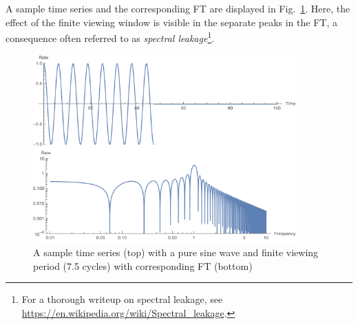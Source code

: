 A sample time series and the corresponding FT are displayed in Fig.~\ref{fig:ex_fft}. Here, the effect of the finite viewing window is visible in the separate peaks in the FT, a consequence often referred to as \textit{spectral leakage}\footnote{For a thorough writeup on spectral leakage, see \url{https://en.wikipedia.org/wiki/Spectral_leakage}.}.
\begin{figure}
    \centering
    \includegraphics[width=0.90\textwidth]{figures/seasonal/box_fft_sample.png}
    \caption[Windowing effect in FFTs]{A sample time series (top) with a pure sine wave and finite viewing period (7.5 cycles) with corresponding FT (bottom)}
    \label{fig:ex_fft}
\end{figure}

